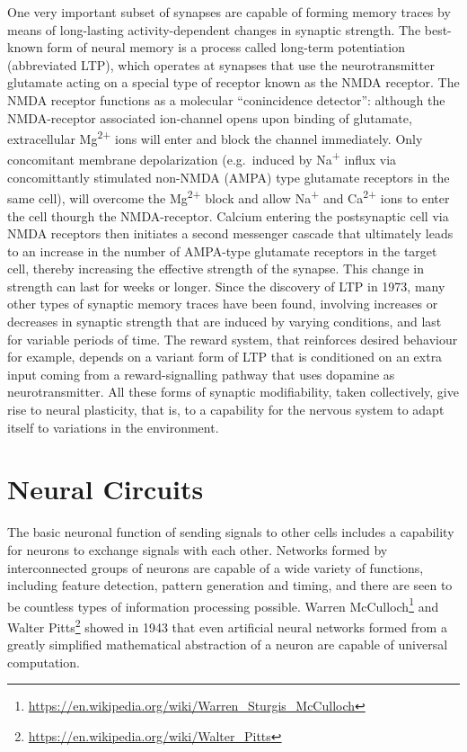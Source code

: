 \documentclass[]{book}
\let\rmarkdownfootnote\footnote%
\def\footnote{\protect\rmarkdownfootnote}
\renewcommand{\href}[2]{#2\footnote{\url{#1}}}
\begin{document}
One very important subset of synapses are capable of forming memory traces by means of long-lasting activity-dependent changes in synaptic strength. The best-known form of neural memory is a process called long-term potentiation (abbreviated LTP), which operates at synapses that use the neurotransmitter glutamate acting on a special type of receptor known as the NMDA receptor. The NMDA receptor functions as a molecular ``conincidence detector'': although the NMDA-receptor associated ion-channel opens upon binding of glutamate, extracellular Mg\textsuperscript{2+} ions will enter and block the channel immediately. Only concomitant membrane depolarization (e.g.~induced by Na\textsuperscript{+} influx via concomittantly stimulated non-NMDA (AMPA) type glutamate receptors in the same cell), will overcome the Mg\textsuperscript{2+} block and allow Na\textsuperscript{+} and Ca\textsuperscript{2+} ions to enter the cell thourgh the NMDA-receptor. Calcium entering the postsynaptic cell via NMDA receptors then initiates a second messenger cascade that ultimately leads to an increase in the number of AMPA-type glutamate receptors in the target cell, thereby increasing the effective strength of the synapse. This change in strength can last for weeks or longer. Since the discovery of LTP in 1973, many other types of synaptic memory traces have been found, involving increases or decreases in synaptic strength that are induced by varying conditions, and last for variable periods of time. The reward system, that reinforces desired behaviour for example, depends on a variant form of LTP that is conditioned on an extra input coming from a reward-signalling pathway that uses dopamine as neurotransmitter. All these forms of synaptic modifiability, taken collectively, give rise to neural plasticity, that is, to a capability for the nervous system to adapt itself to variations in the environment.

\hypertarget{neural-circuits}{%
\section{Neural Circuits}\label{neural-circuits}}

The basic neuronal function of sending signals to other cells includes a capability for neurons to exchange signals with each other. Networks formed by interconnected groups of neurons are capable of a wide variety of functions, including feature detection, pattern generation and timing, and there are seen to be countless types of information processing possible. \href{https://en.wikipedia.org/wiki/Warren_Sturgis_McCulloch}{Warren McCulloch} and \href{https://en.wikipedia.org/wiki/Walter_Pitts}{Walter Pitts} showed in 1943 that even artificial neural networks formed from a greatly simplified mathematical abstraction of a neuron are capable of universal computation.
\end{document}
